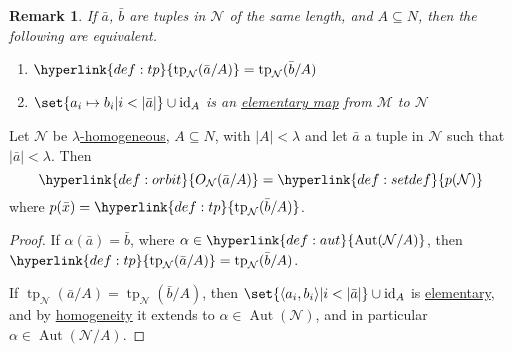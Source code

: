 \documentclass{article}
\let\models\vDash
\DeclareMathOperator{\Aut}{Aut}
\DeclareMathOperator{\tp}{tp}
\newtheorem{nremark}[nthm]{Remark}
\newcommand{\named}[1]{\textbf{#1}\index{#1}}
\begin{document}
\begin{nremark}\label{rem:6.12}
  If $\bar{a}$, $\bar{b}$ are tuples in $\mathcal{N}$ of the same length, and $A\subseteq N$, then the following are equivalent.
  \begin{enumerate}[label=(\roman*)]
    \item $\hyperlink{def:tp}{\tp_{\mathcal{N}}(\bar{a}/A)}= \tp_{\mathcal{N}}(\bar{b}/A)$
    \item $ \set{a_i\mapsto b_i|i < |\bar{a}|}\cup\text{id}_A $ is an \hyperlink{def:el}{elementary map} from $\mathcal{M}$ to $\mathcal{N}$
  \end{enumerate}
\end{nremark}
\begin{nprop}\label{prop:6.13}
  Let $ \mathcal{N} $ be \hyperlink{def:homogeneous}{$\lambda$-homogeneous}, $A\subseteq N$, with $|A|<\lambda$ and let $\bar{a}$ a tuple in $\mathcal{N}$ such that $|\bar{a}|<\lambda$.
  Then
  \begin{equation*}\hyperlink{def:orbit}{O_{\mathcal{N}}(\bar{a}/A)}=\hyperlink{def:setdef}{p(\mathcal{N})}\end{equation*}
  where $p(\bar{x})=\hyperlink{def:tp}{\tp_{\mathcal{N}}(\bar{b}/A)}$.
\end{nprop}
\begin{proof}
  If $\alpha(\bar{a})=\bar{b}$, where $\alpha\in\hyperlink{def:aut}{\Aut(\mathcal{N}/A)}$, then $\hyperlink{def:tp}{\tp_{\mathcal{N}}(\bar{a}/A)}=\tp_{\mathcal{N}}(\bar{b}/A) $.

  If $\tp_{\mathcal{N}}(\bar{a}/A)=\tp_{\mathcal{N}}(\bar{b}/A)$, then $\set{\langle a_i, b_i \rangle | i < |\bar{a}|} \cup \operatorname{id}_A$ is \hyperlink{def:elmap}{elementary}, and by \hyperlink{def:homogeneous}{homogeneity} it extends to $\alpha\in\Aut(\mathcal{N})$, and in particular $\alpha \in \Aut(\mathcal{N}/A)$.
\end{proof}
\end{document}
